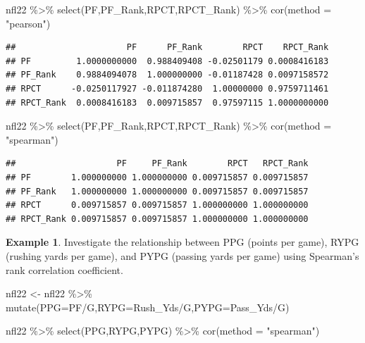 \documentclass[
  11pt,
]{book}
\newenvironment{Shaded}{\begin{snugshade}}{\end{snugshade}}
\newcommand{\AttributeTok}[1]{\textcolor[rgb]{0.77,0.63,0.00}{#1}}
\newcommand{\FunctionTok}[1]{\textcolor[rgb]{0.00,0.00,0.00}{#1}}
\newcommand{\NormalTok}[1]{#1}
\newcommand{\OtherTok}[1]{\textcolor[rgb]{0.56,0.35,0.01}{#1}}
\newcommand{\SpecialCharTok}[1]{\textcolor[rgb]{0.00,0.00,0.00}{#1}}
\newcommand{\StringTok}[1]{\textcolor[rgb]{0.31,0.60,0.02}{#1}}
\theoremstyle{definition}
\theoremstyle{definition}
\newtheorem{example}{Example}[chapter]
\theoremstyle{definition}
\theoremstyle{definition}
\theoremstyle{remark}
\begin{document}
\begin{Shaded}
\begin{Highlighting}[]
\NormalTok{nfl22 }\SpecialCharTok{\%\textgreater{}\%} \FunctionTok{select}\NormalTok{(PF,PF\_Rank,RPCT,RPCT\_Rank) }\SpecialCharTok{\%\textgreater{}\%} \FunctionTok{cor}\NormalTok{(}\AttributeTok{method =} \StringTok{"pearson"}\NormalTok{)}
\end{Highlighting}
\end{Shaded}

\begin{verbatim}
##                      PF      PF_Rank        RPCT    RPCT_Rank
## PF         1.0000000000  0.988409408 -0.02501179 0.0008416183
## PF_Rank    0.9884094078  1.000000000 -0.01187428 0.0097158572
## RPCT      -0.0250117927 -0.011874280  1.00000000 0.9759711461
## RPCT_Rank  0.0008416183  0.009715857  0.97597115 1.0000000000
\end{verbatim}

\begin{Shaded}
\begin{Highlighting}[]
\NormalTok{nfl22 }\SpecialCharTok{\%\textgreater{}\%} \FunctionTok{select}\NormalTok{(PF,PF\_Rank,RPCT,RPCT\_Rank) }\SpecialCharTok{\%\textgreater{}\%} \FunctionTok{cor}\NormalTok{(}\AttributeTok{method =} \StringTok{"spearman"}\NormalTok{)}
\end{Highlighting}
\end{Shaded}

\begin{verbatim}
##                    PF     PF_Rank        RPCT   RPCT_Rank
## PF        1.000000000 1.000000000 0.009715857 0.009715857
## PF_Rank   1.000000000 1.000000000 0.009715857 0.009715857
## RPCT      0.009715857 0.009715857 1.000000000 1.000000000
## RPCT_Rank 0.009715857 0.009715857 1.000000000 1.000000000
\end{verbatim}

\newpage

\begin{example}
Investigate the relationship between PPG (points per game), RYPG (rushing yards per game), and PYPG (passing yards per game) using Spearman's rank correlation coefficient.
\end{example}

\begin{Shaded}
\begin{Highlighting}[]
\NormalTok{nfl22 }\OtherTok{\textless{}{-}}\NormalTok{ nfl22 }\SpecialCharTok{\%\textgreater{}\%} \FunctionTok{mutate}\NormalTok{(}\AttributeTok{PPG=}\NormalTok{PF}\SpecialCharTok{/}\NormalTok{G,}\AttributeTok{RYPG=}\NormalTok{Rush\_Yds}\SpecialCharTok{/}\NormalTok{G,}\AttributeTok{PYPG=}\NormalTok{Pass\_Yds}\SpecialCharTok{/}\NormalTok{G)}

\NormalTok{nfl22 }\SpecialCharTok{\%\textgreater{}\%} \FunctionTok{select}\NormalTok{(PPG,RYPG,PYPG) }\SpecialCharTok{\%\textgreater{}\%} \FunctionTok{cor}\NormalTok{(}\AttributeTok{method =} \StringTok{"spearman"}\NormalTok{)}
\end{Highlighting}
\end{Shaded}
\end{document}
